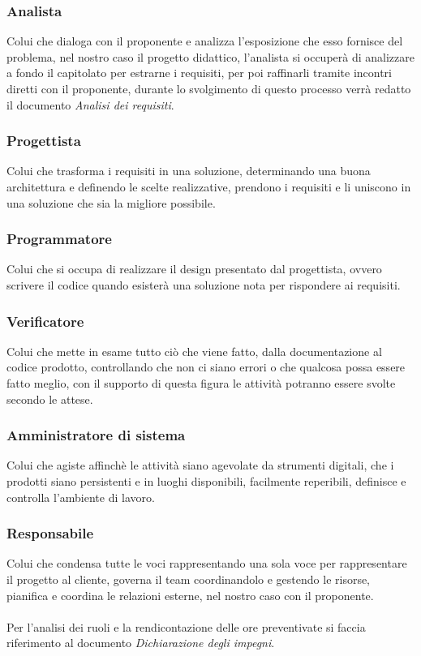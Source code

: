 \subsubsection{Analista}
    Colui che dialoga con il proponente e analizza l'esposizione che esso fornisce del 
    problema, nel nostro caso il progetto didattico, l'analista si occuperà di 
    analizzare a fondo il capitolato per estrarne i requisiti, per poi raffinarli 
    tramite incontri diretti con il proponente, durante lo svolgimento di questo 
    processo verrà redatto il documento \textit{Analisi dei requisiti}.
\subsubsection{Progettista}
    Colui che trasforma i requisiti in una soluzione, determinando una buona 
    architettura e definendo le scelte realizzative, prendono i requisiti 
    e li uniscono in una soluzione che sia la migliore possibile.
\subsubsection{Programmatore}
    Colui che si occupa di realizzare il design presentato dal progettista, 
    ovvero scrivere il codice quando esisterà una soluzione nota per rispondere 
    ai requisiti.
\subsubsection{Verificatore}
    Colui che mette in esame tutto ciò che viene fatto, dalla documentazione 
    al codice prodotto, controllando che non 
    ci siano errori o che qualcosa possa essere fatto meglio, con il supporto 
    di questa figura le attività potranno essere svolte secondo le attese.    
\subsubsection{Amministratore di sistema}
    Colui che agiste affinchè le attività siano agevolate da strumenti digitali, 
    che i prodotti siano persistenti e in luoghi disponibili, facilmente reperibili, definisce e 
    controlla l'ambiente di lavoro.
\subsubsection{Responsabile}
    Colui che condensa tutte le voci rappresentando una sola voce per rappresentare il progetto 
    al cliente, governa il team coordinandolo e gestendo le risorse, pianifica e coordina 
    le relazioni esterne, nel nostro caso con il proponente.\\
    \\
    Per l'analisi dei ruoli e la rendicontazione delle ore preventivate si faccia riferimento al documento \textit{Dichiarazione degli impegni}.

